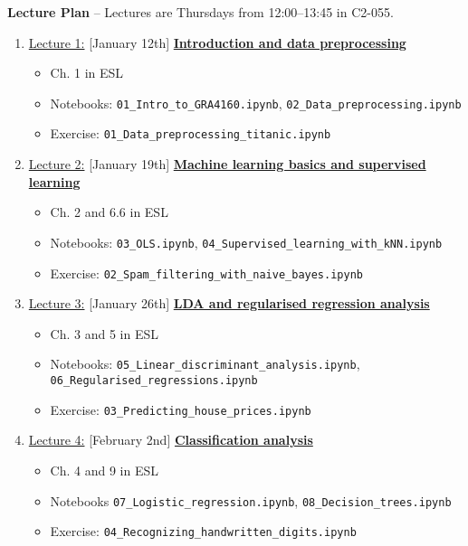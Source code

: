 \documentclass[12pt, a4paper]{article}
\begin{document}
\newpage
\noindent\textbf{\large Lecture Plan}
 -- Lectures are Thursdays from 12:00--13:45 in C2-055. \\
\begin{enumerate}
  \item[] \underline{Lecture 1:} [January 12th] \underline{\bf Introduction and data preprocessing}
     {\small
         \begin{itemize}
             \item Ch. 1 in ESL
             \item Notebooks: \texttt{01\_Intro\_to\_GRA4160.ipynb}, \texttt{02\_Data\_preprocessing.ipynb}
             \item Exercise: \texttt{01\_Data\_preprocessing\_titanic.ipynb}
         \end{itemize}
     }
  \item[] \underline{Lecture 2:} [January 19th] \underline{\bf Machine learning basics and supervised learning}
    {\small
          \begin{itemize}
                \item Ch. 2 and 6.6 in ESL
                \item Notebooks: \texttt{03\_OLS.ipynb}, \texttt{04\_Supervised\_learning\_with\_kNN.ipynb}
                \item Exercise: \texttt{02\_Spam\_filtering\_with\_naive\_bayes.ipynb}
          \end{itemize}
    }
  \item[] \underline{Lecture 3:} [January 26th] \underline{\bf LDA and regularised regression analysis}
    {\small
          \begin{itemize}
              \item Ch. 3 and 5 in ESL
              \item Notebooks: \texttt{05\_Linear\_discriminant\_analysis.ipynb}, \texttt{06\_Regularised\_regressions.ipynb}
              \item Exercise: \texttt{03\_Predicting\_house\_prices.ipynb}
          \end{itemize}
    }
  \item [] \underline{Lecture 4:} [February 2nd] \underline{\bf Classification analysis}
    {\small
            \begin{itemize}
                \item Ch. 4 and 9 in ESL
                \item Notebooks \texttt{07\_Logistic\_regression.ipynb}, \texttt{08\_Decision\_trees.ipynb}
                \item Exercise: \texttt{04\_Recognizing\_handwritten\_digits.ipynb}

\end{itemize}}
\end{enumerate}
\end{document}
